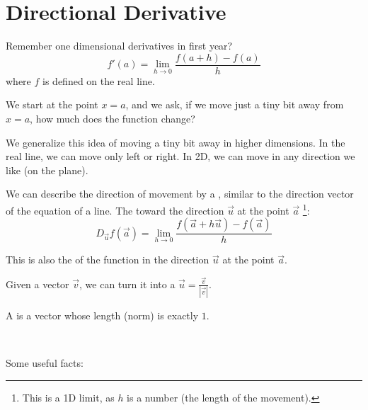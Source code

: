 \documentclass[11pt,fleqn]{book} %
\begin{document}
\section{Directional Derivative}

Remember one dimensional derivatives in first year?
$$f'(a) = \lim_{h \to 0} \frac{f(a + h) - f(a)}{h}$$ where $f$ is defined on the real line.

We start at the point $x = a$, and we ask, if we move just a tiny bit away from $x = a$, how much does the function change?

We generalize this idea of moving a tiny bit away in higher dimensions. In the real line, we can move only left or right. In 2D, we can move in any direction we like (on the plane).

We can describe the direction of movement by a , similar to the direction vector of the equation of a line. The  toward the direction $\vec{u}$ at the point $\vec{a}$ \footnote{This is a 1D limit, as $h$ is a number (the length of the movement). }: $$D_{\vec{u}} f(\vec{a}) = \lim_{h \to 0} \frac{f(\vec{a} + h\vec{u}) - f(\vec{a})}{h}$$ 

This is also the  of the function in the direction $\vec{u}$ at the point $\vec{a}$. 

Given a vector $\vec{v}$, we can turn it into a  $\vec{u} = \frac{\vec{v}}{| \vec{v} |}$. 

\begin{definition}
    A  is a vector whose length (norm) is exactly $1$. 
\end{definition}

{~~~}

Some useful facts:
\end{document}
